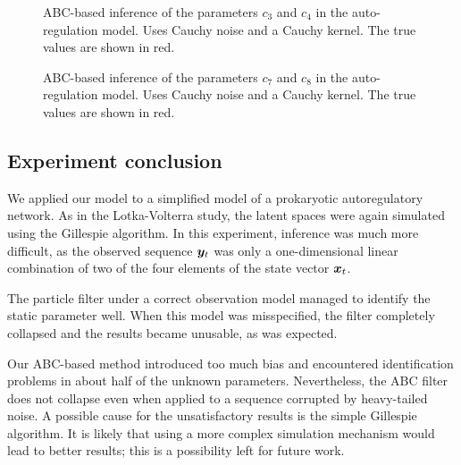 \begin{figure}[htp]%
    \centering
    \qquad
    \caption{ABC-based inference of the parameters $c_3$ and $c_4$ in the auto-regulation model. Uses Cauchy noise and a Cauchy kernel. The true values are shown in red.}%
    \label{fig:ar-abcmh-cauchy-cauchy-2}%
\end{figure}

\begin{figure}[htp]%
    \centering
    \qquad
    \caption{ABC-based inference of the parameters $c_7$ and $c_8$ in the auto-regulation model. Uses Cauchy noise and a Cauchy kernel. The true values are shown in red.}%
    \label{fig:ar-abcmh-cauchy-cauchy-3}%
\end{figure}


\subsection{Experiment conclusion}
We applied our model to a simplified model of a prokaryotic autoregulatory network. As in the Lotka-Volterra study, the latent spaces were again simulated using the Gillespie algorithm. In this experiment, inference was much more difficult, as the observed sequence $\bm{y}_t$ was only a one-dimensional linear combination of two of the four elements of the state vector $\bm{x}_t$.

The particle filter under a correct observation model managed to identify the static parameter well. When this model was misspecified, the filter completely collapsed and the results became unusable, as was expected.

Our ABC-based method introduced too much bias and encountered identification problems in about half of the unknown parameters. Nevertheless, the ABC filter does not collapse even when applied to a sequence corrupted by heavy-tailed noise. A possible cause for the unsatisfactory results is the simple Gillespie algorithm. It is likely that using a more complex simulation mechanism would lead to better results; this is a possibility left for future work.
